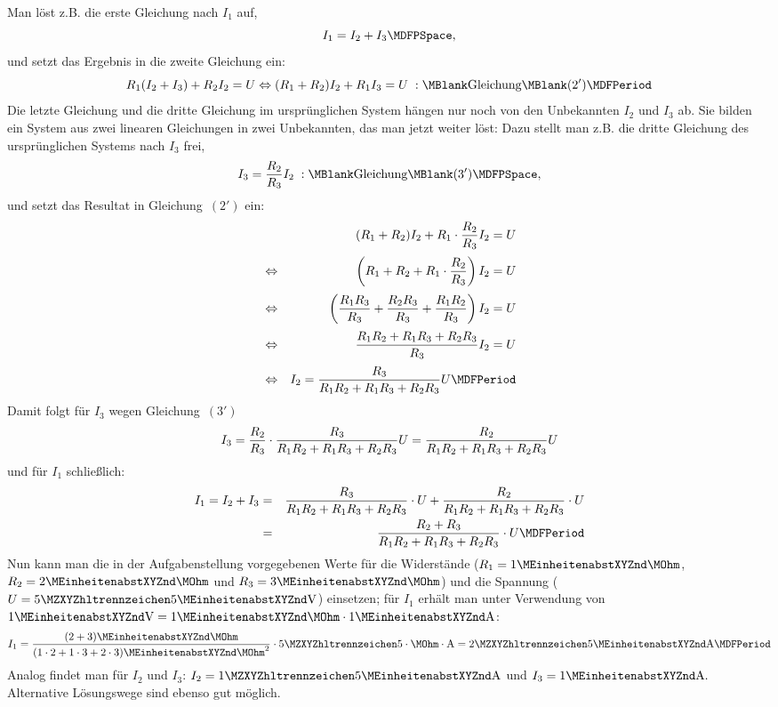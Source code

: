 \begin{MExercises}
\begin{MExercise}
\begin{MHint}{\iSolution}
Man löst z.B. die erste Gleichung nach $I_1$ auf,
$$I_1 = I_2 + I_3 \MDFPSpace ,$$
und setzt das Ergebnis in die zweite Gleichung ein:
$$R_1 (I_2 + I_3) + R_2 I_2 = U \Leftrightarrow (R_1 + R_2) I_2 + R_1 I_3 = U \; : \MBlank\mbox{Gleichung}\MBlank (2') \MDFPeriod$$
Die letzte Gleichung und die dritte Gleichung im ursprünglichen System hängen nur noch von den Unbekannten
$I_2$ und $I_3$ ab. Sie bilden ein System aus zwei linearen Gleichungen in zwei Unbekannten, das man jetzt
weiter löst: Dazu stellt man z.B. die dritte Gleichung des ursprünglichen Systems nach $I_3$ frei,
$$I_3 = \Mdfrac{R_2}{R_3} I_2 \; : \MBlank\mbox{Gleichung}\MBlank (3') \MDFPSpace ,$$
und setzt das Resultat in Gleichung~$(2')$ ein:
\begin{eqnarray*}
& & (R_1 + R_2) I_2 + R_1 \cdot \Mdfrac{R_2}{R_3} I_2 = U \\[.5ex]
& \Leftrightarrow & \left( R_1 + R_2 + R_1 \cdot \Mdfrac{R_2}{R_3} \right) I_2 = U \\[.5ex]
& \Leftrightarrow & \left( \Mdfrac{R_1 R_3}{R_3} + \Mdfrac{R_2 R_3}{R_3} + \Mdfrac{R_1 R_2}{R_3} \right) I_2 = U \\[.5ex]
& \Leftrightarrow & \Mdfrac{R_1 R_2 + R_1 R_3 + R_2 R_3}{R_3} I_2 = U \\[.5ex]
& \Leftrightarrow & I_2 = \Mdfrac{R_3}{R_1 R_2 + R_1 R_3 + R_2 R_3} U \MDFPeriod
\end{eqnarray*}
Damit folgt für $I_3$ wegen Gleichung~$(3')$
$$I_3 = \dfrac{R_2}{R_3} \cdot \dfrac{R_3}{R_1 R_2 + R_1 R_3 + R_2 R_3} U = \dfrac{R_2}{R_1 R_2 + R_1 R_3 + R_2 R_3} U$$
und für $I_1$ schließlich:
\begin{eqnarray*}
  I_1 = I_2 + I_3 &=& \Mdfrac{R_3}{R_1 R_2 + R_1 R_3 + R_2 R_3} \cdot U + \Mdfrac{R_2}{R_1 R_2 + R_1 R_3 + R_2 R_3} \cdot U \\
  &=& \Mdfrac{R_2 + R_3}{R_1 R_2 + R_1 R_3 + R_2 R_3} \cdot U \MDFPeriod
\end{eqnarray*}
Nun kann man die in der Aufgabenstellung vorgegebenen Werte für die Widerstände
($R_1 = 1\MEinheit{}\MOhm$, $R_2 = 2\MEinheit{}\MOhm$ und $R_3 = 3\MEinheit{}\MOhm$)
und die Spannung ($U = \MZahl{5}{5}\MEinheit{V}$) einsetzen; für $I_1$ erhält man unter Verwendung von $1\MEinheit{V} = 1\MEinheit{}\MOhm \cdot 1\MEinheit{A}$:
$$I_1 = \Mdfrac{(2 + 3)\MEinheit{}\MOhm}{(1 \cdot 2 + 1 \cdot 3 + 2 \cdot 3)\MEinheit{}\MOhm^2} \cdot \MZahl{5}{5} \cdot \MOhm \cdot \MEinheit[]{A}
= \MZahl{2}{5}\MEinheit{A} \MDFPeriod$$
Analog findet man für $I_2$ und $I_3$: $I_2 = \MZahl{1}{5}\MEinheit{A}$ und $I_3 = 1\MEinheit{A}.$\\
Alternative Lösungswege sind ebenso gut möglich.
\end{MHint}
\end{MExercise}


\end{MExercises}
